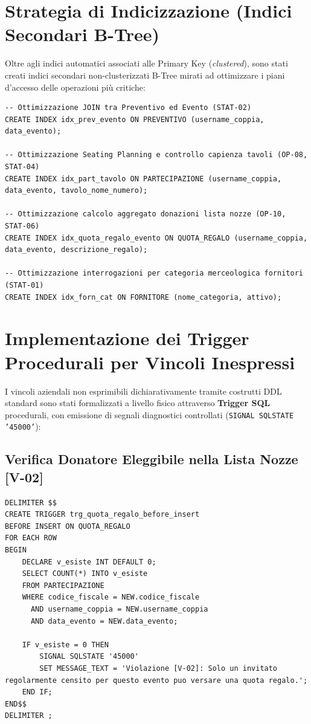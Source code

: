 \section{Strategia di Indicizzazione (Indici Secondari B-Tree)}
Oltre agli indici automatici associati alle Primary Key (\textit{clustered}), sono stati creati indici secondari non-clusterizzati B-Tree mirati ad ottimizzare i piani d'accesso delle operazioni più critiche:
\begin{lstlisting}
-- Ottimizzazione JOIN tra Preventivo ed Evento (STAT-02)
CREATE INDEX idx_prev_evento ON PREVENTIVO (username_coppia, data_evento);

-- Ottimizzazione Seating Planning e controllo capienza tavoli (OP-08, STAT-04)
CREATE INDEX idx_part_tavolo ON PARTECIPAZIONE (username_coppia, data_evento, tavolo_nome_numero);

-- Ottimizzazione calcolo aggregato donazioni lista nozze (OP-10, STAT-06)
CREATE INDEX idx_quota_regalo_evento ON QUOTA_REGALO (username_coppia, data_evento, descrizione_regalo);

-- Ottimizzazione interrogazioni per categoria merceologica fornitori (STAT-01)
CREATE INDEX idx_forn_cat ON FORNITORE (nome_categoria, attivo);
\end{lstlisting}

\section{Implementazione dei Trigger Procedurali per Vincoli Inespressi}
I vincoli aziendali non esprimibili dichiarativamente tramite costrutti DDL standard sono stati formalizzati a livello fisico attraverso \textbf{Trigger SQL} procedurali, con emissione di segnali diagnostici controllati (\texttt{SIGNAL SQLSTATE '45000'}):

\subsection{Verifica Donatore Eleggibile nella Lista Nozze [V-02]}
\begin{lstlisting}
DELIMITER $$
CREATE TRIGGER trg_quota_regalo_before_insert
BEFORE INSERT ON QUOTA_REGALO
FOR EACH ROW
BEGIN
    DECLARE v_esiste INT DEFAULT 0;
    SELECT COUNT(*) INTO v_esiste
    FROM PARTECIPAZIONE
    WHERE codice_fiscale = NEW.codice_fiscale
      AND username_coppia = NEW.username_coppia
      AND data_evento = NEW.data_evento;

    IF v_esiste = 0 THEN
        SIGNAL SQLSTATE '45000'
        SET MESSAGE_TEXT = 'Violazione [V-02]: Solo un invitato regolarmente censito per questo evento puo versare una quota regalo.';
    END IF;
END$$
DELIMITER ;
\end{lstlisting}

